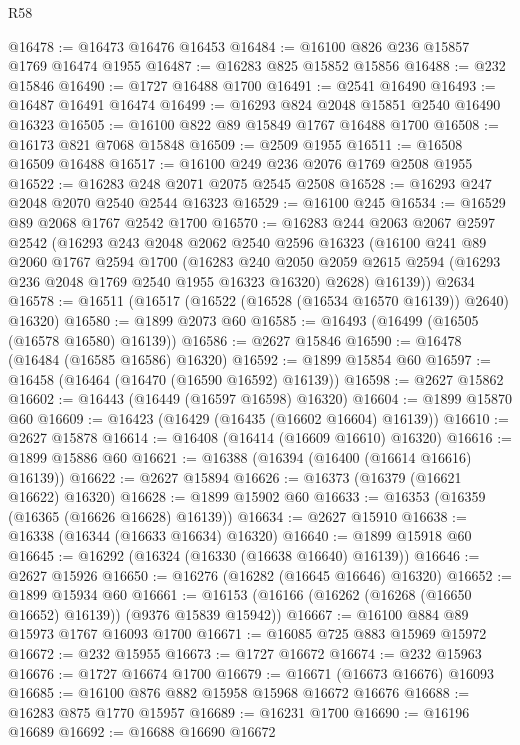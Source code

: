 \begin{lexlean}{R58}
\begin{coremodule}
@16478 := @16473 @16476 @16453
@16484 := @16100 @826 @236 @15857 @1769 @16474 @1955
@16487 := @16283 @825 @15852 @15856
@16488 := @232 @15846
@16490 := @1727 @16488 @1700
@16491 := @2541 @16490
@16493 := @16487 @16491 @16474
@16499 := @16293 @824 @2048 @15851 @2540 @16490 @16323
@16505 := @16100 @822 @89 @15849 @1767 @16488 @1700
@16508 := @16173 @821 @7068 @15848
@16509 := @2509 @1955
@16511 := @16508 @16509 @16488
@16517 := @16100 @249 @236 @2076 @1769 @2508 @1955
@16522 := @16283 @248 @2071 @2075 @2545 @2508
@16528 := @16293 @247 @2048 @2070 @2540 @2544 @16323
@16529 := @16100 @245
@16534 := @16529 @89 @2068 @1767 @2542 @1700
@16570 := @16283
    @244
    @2063
    @2067
    @2597
    @2542
    (@16293
      @243
      @2048
      @2062
      @2540
      @2596
      @16323
      (@16100
        @241
        @89
        @2060
        @1767
        @2594
        @1700
        (@16283
          @240
          @2050
          @2059
          @2615
          @2594
          (@16293 @236 @2048 @1769 @2540 @1955 @16323 @16320)
          @2628)
        @16139))
    @2634
@16578 := @16511 (@16517 (@16522 (@16528 (@16534 @16570 @16139)) @2640) @16320)
@16580 := @1899 @2073 @60
@16585 := @16493 (@16499 (@16505 (@16578 @16580) @16139))
@16586 := @2627 @15846
@16590 := @16478 (@16484 (@16585 @16586) @16320)
@16592 := @1899 @15854 @60
@16597 := @16458 (@16464 (@16470 (@16590 @16592) @16139))
@16598 := @2627 @15862
@16602 := @16443 (@16449 (@16597 @16598) @16320)
@16604 := @1899 @15870 @60
@16609 := @16423 (@16429 (@16435 (@16602 @16604) @16139))
@16610 := @2627 @15878
@16614 := @16408 (@16414 (@16609 @16610) @16320)
@16616 := @1899 @15886 @60
@16621 := @16388 (@16394 (@16400 (@16614 @16616) @16139))
@16622 := @2627 @15894
@16626 := @16373 (@16379 (@16621 @16622) @16320)
@16628 := @1899 @15902 @60
@16633 := @16353 (@16359 (@16365 (@16626 @16628) @16139))
@16634 := @2627 @15910
@16638 := @16338 (@16344 (@16633 @16634) @16320)
@16640 := @1899 @15918 @60
@16645 := @16292 (@16324 (@16330 (@16638 @16640) @16139))
@16646 := @2627 @15926
@16650 := @16276 (@16282 (@16645 @16646) @16320)
@16652 := @1899 @15934 @60
@16661 := @16153 (@16166 (@16262 (@16268 (@16650 @16652) @16139)) (@9376 @15839 @15942))
@16667 := @16100 @884 @89 @15973 @1767 @16093 @1700
@16671 := @16085 @725 @883 @15969 @15972
@16672 := @232 @15955
@16673 := @1727 @16672
@16674 := @232 @15963
@16676 := @1727 @16674 @1700
@16679 := @16671 (@16673 @16676) @16093
@16685 := @16100 @876 @882 @15958 @15968 @16672 @16676
@16688 := @16283 @875 @1770 @15957
@16689 := @16231 @1700
@16690 := @16196 @16689
@16692 := @16688 @16690 @16672

\end{coremodule}
\end{lexlean}
